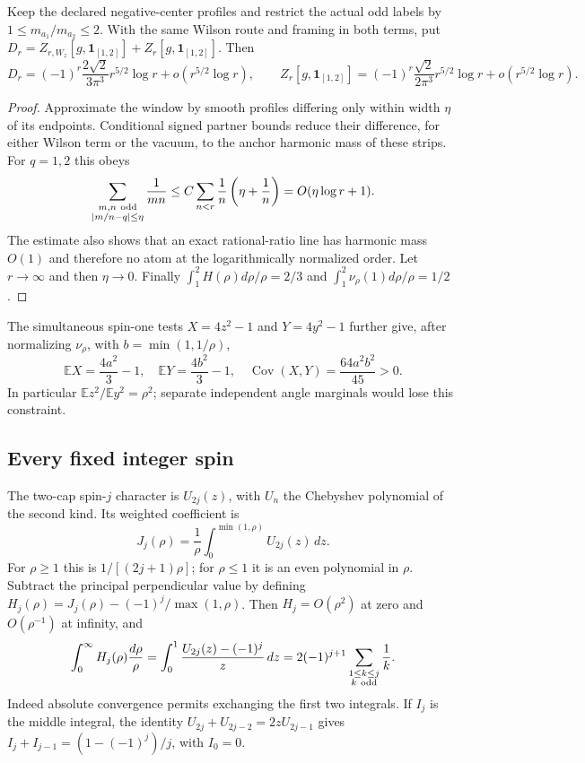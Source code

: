 \begin{corollary}\label{cor:ratio-window}
Keep the declared negative-center profiles and restrict the actual
odd labels by $1\le m_{a_1}/m_{a_2}\le2$. With the same Wilson route
and framing in both terms, put
$D_r=Z_{r,W_z}[g,\mathbf1_{[1,2]}]+Z_r[g,\mathbf1_{[1,2]}]$.
Then
\[
 D_r=(-1)^r\frac{2\sqrt2}{3\pi^3}r^{5/2}\log r
                  +o(r^{5/2}\log r),
 \qquad
 Z_r[g,\mathbf1_{[1,2]}]
 =(-1)^r\frac{\sqrt2}{2\pi^3}r^{5/2}\log r
                  +o(r^{5/2}\log r).
\]
\end{corollary}
\begin{proof}
Approximate the window by smooth profiles differing only within
width $\eta$ of its endpoints. Conditional signed partner bounds
reduce their difference, for either Wilson term or the vacuum, to
the anchor harmonic mass of these strips. For $q=1,2$ this obeys
\[
 \sum_{\substack{m,n\ {\rm odd}\\|m/n-q|\le\eta}}
      \frac1{mn}
 \le C\sum_{n<r}\frac1n\left(\eta+\frac1n\right)
 =O(\eta\log r+1).
\]
The estimate also shows that an exact rational-ratio line has
harmonic mass $O(1)$ and therefore no atom at the logarithmically
normalized order. Let $r\to\infty$ and then $\eta\to0$.
Finally
$\int_1^2H(\rho)d\rho/\rho=2/3$ and
$\int_1^2\nu_\rho(1)d\rho/\rho=1/2$.
\end{proof}

The simultaneous spin-one tests $X=4z^2-1$ and $Y=4y^2-1$ further
give, after normalizing $\nu_\rho$, with $b=\min(1,1/\rho)$,
\[
 \mathbb EX=\frac{4a^2}{3}-1,\quad
 \mathbb EY=\frac{4b^2}{3}-1,\quad
 \operatorname{Cov}(X,Y)=\frac{64a^2b^2}{45}>0.
\]
In particular $\mathbb E z^2/\mathbb E y^2=\rho^2$; separate
independent angle marginals would lose this constraint.

\subsection{Every fixed integer spin}
The two-cap spin-$j$ character is $U_{2j}(z)$, with $U_n$ the
Chebyshev polynomial of the second kind. Its weighted coefficient is
\[
 J_j(\rho)=\frac1\rho\int_0^{\min(1,\rho)}U_{2j}(z)\,dz.
\]
For $\rho\ge1$ this is $1/[(2j+1)\rho]$; for $\rho\le1$ it is
an even polynomial in $\rho$. Subtract the principal perpendicular
value by defining
$H_j(\rho)=J_j(\rho)-(-1)^j/\max(1,\rho)$.
Then $H_j=O(\rho^2)$ at zero and $O(\rho^{-1})$ at infinity, and
\begin{equation}\label{eq:ratio-spin-integral}
 \int_0^\infty H_j(\rho)\frac{d\rho}{\rho}
 =\int_0^1\frac{U_{2j}(z)-(-1)^j}{z}\,dz
 =2(-1)^{j+1}\sum_{\substack{1\le k\le j\\k\ {\rm odd}}}\frac1k.
\end{equation}
Indeed absolute convergence permits exchanging the first two
integrals. If $I_j$ is the middle integral, the identity
$U_{2j}+U_{2j-2}=2zU_{2j-1}$ gives
$I_j+I_{j-1}=(1-(-1)^j)/j$, with $I_0=0$.

